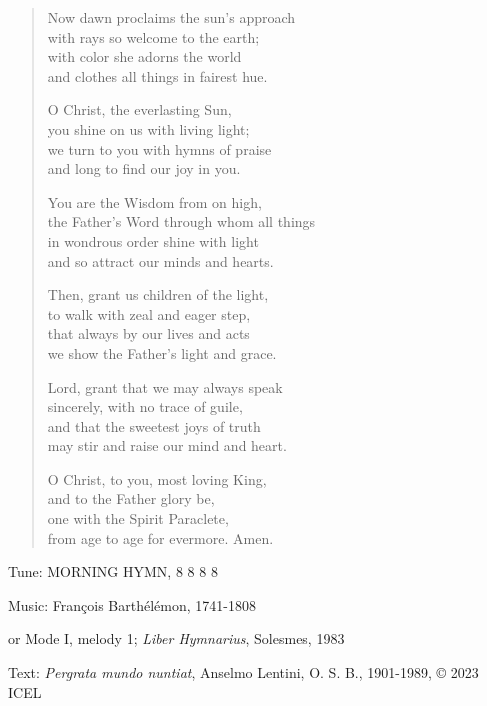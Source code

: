\hymn

\begin{verse}
Now dawn proclaims the sun’s approach\\
with rays so welcome to the earth;\\
with color she adorns the world\\
and clothes all things in fairest hue.

O Christ, the everlasting Sun,\\
you shine on us with living light;\\
we turn to you with hymns of praise\\
and long to find our joy in you.

You are the Wisdom from on high,\\
the Father’s Word through whom all things\\
in wondrous order shine with light\\
and so attract our minds and hearts.

Then, grant us children of the light,\\
to walk with zeal and eager step,\\
that always by our lives and acts\\
we show the Father’s light and grace.

Lord, grant that we may always speak\\
sincerely, with no trace of guile,\\
and that the sweetest joys of truth\\
may stir and raise our mind and heart.

O Christ, to you, most loving King,\\
and to the Father glory be,\\
one with the Spirit Paraclete,\\
from age to age for evermore. Amen.
\end{verse}

\begin{hymnsource}
Tune: MORNING HYMN, 8 8 8 8

Music: François Barthélémon, 1741-1808

or Mode I, melody 1; \emph{Liber Hymnarius}, Solesmes, 1983

Text: \emph{Pergrata mundo nuntiat}, Anselmo Lentini, O. S. B., 1901-1989, © 2023 ICEL
\end{hymnsource}